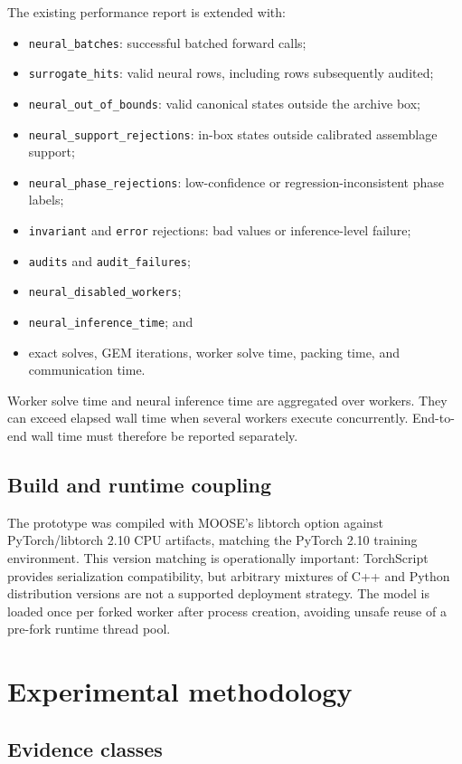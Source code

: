 \documentclass[11pt]{article}
\newcommand{\code}[1]{\texttt{#1}}
\begin{document}
The existing performance report is extended with:
\begin{itemize}[leftmargin=*]
  \item \code{neural\_batches}: successful batched forward calls;
  \item \code{surrogate\_hits}: valid neural rows, including rows subsequently audited;
  \item \code{neural\_out\_of\_bounds}: valid canonical states outside the archive box;
  \item \code{neural\_support\_rejections}: in-box states outside calibrated assemblage support;
  \item \code{neural\_phase\_rejections}: low-confidence or regression-inconsistent phase labels;
  \item \code{invariant} and \code{error} rejections: bad values or inference-level failure;
  \item \code{audits} and \code{audit\_failures};
  \item \code{neural\_disabled\_workers};
  \item \code{neural\_inference\_time}; and
  \item exact solves, GEM iterations, worker solve time, packing time, and communication time.
\end{itemize}
Worker solve time and neural inference time are aggregated over workers.  They can exceed elapsed
wall time when several workers execute concurrently.  End-to-end wall time must therefore be
reported separately.

\subsection{Build and runtime coupling}

The prototype was compiled with MOOSE's libtorch option against PyTorch/libtorch 2.10 CPU
artifacts, matching the PyTorch 2.10 training environment.  This version matching is operationally
important: TorchScript provides serialization compatibility, but arbitrary mixtures of C++ and
Python distribution versions are not a supported deployment strategy.  The model is loaded once
per forked worker after process creation, avoiding unsafe reuse of a pre-fork runtime thread pool.

\section{Experimental methodology}

\subsection{Evidence classes}
\end{document}
